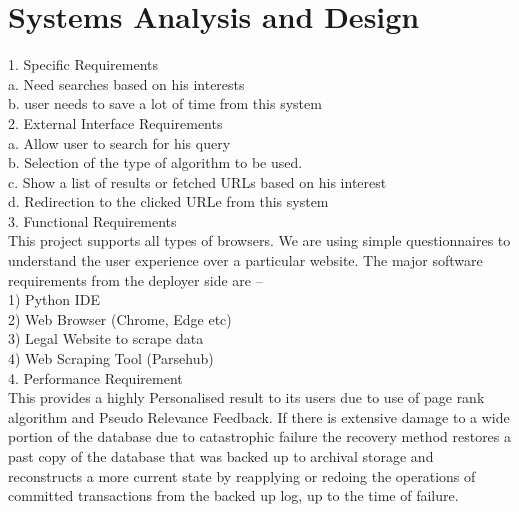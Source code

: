 \newpage
\chapter{Systems Analysis and Design}

1. Specific Requirements\\
a. Need searches based on his interests\\
b. user needs to save a lot of time from this system\\

2. External Interface Requirements\\
a. Allow user to search for his query\\
b. Selection of the type of algorithm to be used.\\
c. Show a list of results or fetched URLs based on his interest\\
d. Redirection to the clicked URLe from this system\\

3. Functional Requirements\\
This project supports all types of browsers. We are using simple questionnaires to
understand the user experience over a particular website.
The major software requirements from the deployer side are –\\
1) Python IDE\\
2) Web Browser (Chrome, Edge etc)\\
3) Legal Website to scrape data\\
4) Web Scraping Tool (Parsehub)\\

4. Performance Requirement\\
This provides a highly Personalised result to its users due to use of page rank algorithm and
Pseudo Relevance Feedback. If there is extensive damage to a wide portion of the database
due to catastrophic failure the recovery method restores a past copy of the database that
was backed up to archival storage and reconstructs a more current state by reapplying or
redoing the operations of committed transactions from the backed up log, up to the time of
failure.\\

